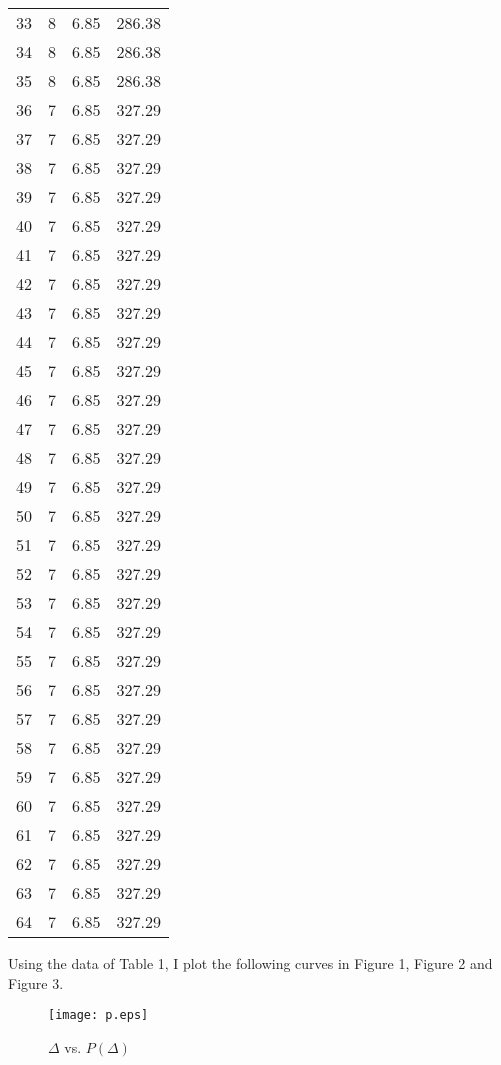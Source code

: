 \documentclass[12pt,letterpaper]{article}
\begin{document}
\begin{center}
\begin{longtable}{r|r|r|r}
33 & 8 & 6.85 & 286.38\\
34 & 8 & 6.85 & 286.38\\
35 & 8 & 6.85 & 286.38\\
36 & 7 & 6.85 & 327.29\\
37 & 7 & 6.85 & 327.29\\
38 & 7 & 6.85 & 327.29\\
39 & 7 & 6.85 & 327.29\\
40 & 7 & 6.85 & 327.29\\
41 & 7 & 6.85 & 327.29\\
42 & 7 & 6.85 & 327.29\\
43 & 7 & 6.85 & 327.29\\
44 & 7 & 6.85 & 327.29\\
45 & 7 & 6.85 & 327.29\\
46 & 7 & 6.85 & 327.29\\
47 & 7 & 6.85 & 327.29\\
48 & 7 & 6.85 & 327.29\\
49 & 7 & 6.85 & 327.29\\
50 & 7 & 6.85 & 327.29\\
51 & 7 & 6.85 & 327.29\\
52 & 7 & 6.85 & 327.29\\
53 & 7 & 6.85 & 327.29\\
54 & 7 & 6.85 & 327.29\\
55 & 7 & 6.85 & 327.29\\
56 & 7 & 6.85 & 327.29\\
57 & 7 & 6.85 & 327.29\\
58 & 7 & 6.85 & 327.29\\
59 & 7 & 6.85 & 327.29\\
60 & 7 & 6.85 & 327.29\\
61 & 7 & 6.85 & 327.29\\
62 & 7 & 6.85 & 327.29\\
63 & 7 & 6.85 & 327.29\\
64 & 7 & 6.85 & 327.29\\
\end{longtable}
\end{center}

Using the data of Table 1, I plot the following curves in Figure 1, Figure 2 and Figure 3.

\begin{figure}
\begin{center}
\texttt{[image: p.eps]}
\caption{$\Delta$ vs. $P(\Delta)$}
\end{center}
\end{figure}
\end{document}

